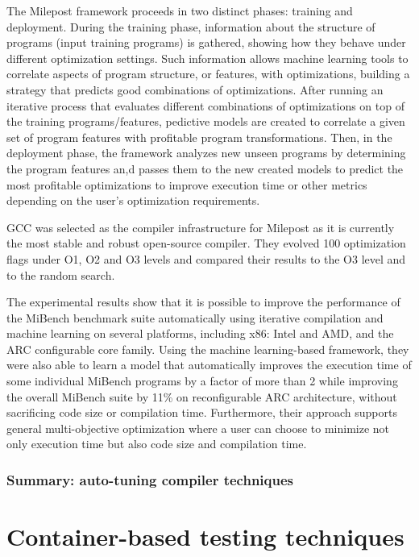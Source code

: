 The Milepost framework proceeds in two distinct phases: training and deployment. During the training phase, information about the structure of programs (input training programs) is gathered, showing how they behave under different optimization settings. Such information allows machine learning tools to correlate aspects of program structure, or features, with optimizations, building a strategy that predicts good combinations of optimizations. 
After running an iterative process that evaluates different combinations of optimizations on top of the training programs/features, pedictive models are created to correlate a given set of program features with profitable program transformations. 
Then, in the deployment phase, the framework analyzes new unseen programs by determining the program features an,d passes them to the new created models to predict the most profitable optimizations to improve execution time or other metrics depending on the user’s optimization requirements.

GCC was selected as the compiler infrastructure for Milepost as it is currently the most stable and robust open-source compiler. They evolved 100 optimization flags under O1, O2 and O3 levels and compared their results to the O3 level and to the random search.

The experimental results show that it is possible to improve the performance of the MiBench benchmark suite automatically using iterative compilation and machine learning on several platforms, including x86: Intel and AMD, and the ARC configurable core family. Using the machine learning-based framework, they were also able to learn a model that automatically improves the execution time of some individual MiBench programs by a factor of more than 2 while improving the overall MiBench suite by 11\% on reconfigurable ARC architecture, without sacrificing code size or compilation time. Furthermore, their approach supports general multi-objective optimization where a user can choose to minimize not only execution time but also code size and compilation time.



\subsubsection{Summary: auto-tuning compiler techniques}
 



\section{Container-based testing techniques}

